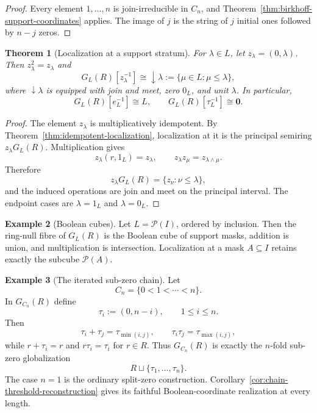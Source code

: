 \documentclass[11pt]{amsart}
\numberwithin{equation}{section}
\newtheorem{theorem}{Theorem}[section]
\theoremstyle{definition}
\newtheorem{example}[theorem]{Example}
\newcommand{\zero}{\mathbf 0}
\begin{document}
\begin{proof}
Every element $1,\ldots,n$ is join-irreducible in $C_n$, and
Theorem~\ref{thm:birkhoff-support-coordinates} applies.  The image of $j$
is the string of $j$ initial ones followed by $n-j$ zeros.
\end{proof}

\begin{theorem}[Localization at a support stratum]
\label{thm:lattice-localization}
For $\lambda\in L$, let $z_\lambda=(0,\lambda)$.  Then
$z_\lambda^2=z_\lambda$ and
\[
G_L(R)[z_\lambda^{-1}]
\cong
\downarrow\lambda
:=\{\mu\in L:\mu\leq\lambda\},
\]
where $\downarrow\lambda$ is equipped with join and meet, zero $0_L$, and
unit $\lambda$.  In particular,
\[
G_L(R)[e_L^{-1}]\cong L,
\qquad
G_L(R)[\tau_L^{-1}]\cong\zero.
\]
\end{theorem}

\begin{proof}
The element $z_\lambda$ is multiplicatively idempotent.  By
Theorem~\ref{thm:idempotent-localization}, localization at it is the
principal semiring $z_\lambda G_L(R)$.  Multiplication gives
\[
z_\lambda(r,1_L)=z_\lambda,
\qquad
z_\lambda z_\mu=z_{\lambda\wedge\mu}.
\]
Therefore
\[
z_\lambda G_L(R)=\{z_\nu:\nu\leq\lambda\},
\]
and the induced operations are join and meet on the principal interval.
The endpoint cases are $\lambda=1_L$ and $\lambda=0_L$.
\end{proof}

\begin{example}[Boolean cubes]
Let $L=\mathcal P(I)$, ordered by inclusion.  Then the ring-null fibre of
$G_L(R)$ is the Boolean cube of support masks, addition is union, and
multiplication is intersection.  Localization at a mask $A\subseteq I$
retains exactly the subcube $\mathcal P(A)$.
\end{example}

\begin{example}[The iterated sub-zero chain]
Let
\[
C_n=\{0<1<\cdots<n\}.
\]
In $G_{C_n}(R)$ define
\[
\tau_i:=(0,n-i),
\qquad 1\leq i\leq n.
\]
Then
\[
\tau_i+\tau_j=\tau_{\min(i,j)},
\qquad
\tau_i\tau_j=\tau_{\max(i,j)},
\]
while $r+\tau_i=r$ and $r\tau_i=\tau_i$ for $r\in R$.  Thus
$G_{C_n}(R)$ is exactly the $n$-fold sub-zero globalization
\[
R\sqcup\{\tau_1,\dots,\tau_n\}.
\]
The case $n=1$ is the ordinary split-zero construction.  Corollary~\ref{cor:chain-threshold-reconstruction} gives its faithful Boolean-coordinate realization at every length.
\end{example}
\end{document}
